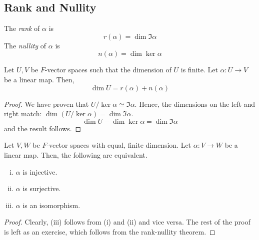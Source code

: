 \subsection{Rank and Nullity}
\begin{definition}
    The \textit{rank} of \( \alpha \) is
    \[ r(\alpha) = \dim\Im \alpha \]
    The \textit{nullity} of \( \alpha \) is
    \[ n(\alpha) = \dim\ker \alpha \]
\end{definition}
\begin{theorem}
    Let \( U, V \) be \( F \)-vector spaces such that the dimension of \( U \) is finite.
    Let \( \alpha \colon U \to V \) be a linear map.
    Then,
    \[ \dim U = r(\alpha) + n(\alpha) \]
\end{theorem}
\begin{proof}
    We have proven that \( U / \ker \alpha \simeq \Im \alpha \).
    Hence, the dimensions on the left and right match: \( \dim (U/\ker\alpha) = \dim \Im \alpha \).
    \[ \dim U - \dim \ker \alpha = \dim \Im \alpha \]
    and the result follows.
\end{proof}
\begin{lemma}
    Let \( V, W \) be \( F \)-vector spaces with equal, finite dimension.
    Let \( \alpha \colon V \to W \) be a linear map.
    Then, the following are equivalent.
    \begin{enumerate}[(i)]
        \item \( \alpha \) is injective.
        \item \( \alpha \) is surjective.
        \item \( \alpha \) is an isomorphism.
    \end{enumerate}
\end{lemma}
\begin{proof}
    Clearly, (iii) follows from (i) and (ii) and vice versa.
    The rest of the proof is left as an exercise, which follows from the rank-nullity theorem.
\end{proof}

